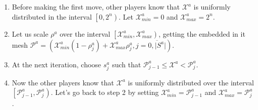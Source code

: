 \begin{enumerate}
	\item Before making the first move, other players know that $\mathcal{X}^a$ is uniformly distributed in the interval $\left[0, 2^n\right)$. Let $\mathcal{X}^a_{min} = 0$ and $\mathcal{X}^a_{max} = 2^n$. %
	\item Let us scale $\rho^a$ over the interval $\left[\mathcal{X}^a_{min}, \mathcal{X}^a_{max}\right)$, getting the embedded in it mesh $\mathcal{P}^a = (\mathcal{X}^a_{min} (1 - \rho^a_j) + \mathcal{X}^a_{max} \rho^a_j, j = \overline{0, \lvert S^a \rvert})$. %
	\item At the next iteration, choose $s^a_j$ such that $\mathcal{P}^a_{j-1} \le \mathcal{X}^a < \mathcal{P}^a_j$. %
	\item Now the other players know that $\mathcal{X}^a$ is uniformly distributed over the interval $\left[\mathcal{P}^a_{j-1}, \mathcal{P}^a_j\right)$. Let's go back to step 2 by setting $\mathcal{X}^a_{min} = \mathcal{P}^a_{j-1}$ and $\mathcal{X}^a_{max} = \mathcal{P}^ a_j$. %
\end{enumerate}

